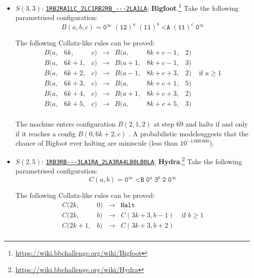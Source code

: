 \documentclass[a4paper,british]{article}
\theoremstyle{definition} %
\numberwithin{equation}{section}
\theoremstyle{definition} %
\newcommand{\tm}[1]{\href{https://bbchallenge.org/#1}{\texttt{\nolinkurl{#1}}}}
\newcommand{\szero}{\texttt{0}\xspace}
\newcommand{\sone}{\texttt{1}\xspace}
\begin{document}
\begin{itemize}
    \item $S(3,3)$: \tm{1RB2RA1LC_2LC1RB2RB_---2LA1LA}; \textbf{Bigfoot}.\footnote{\label{note:bigfoot}\url{https://wiki.bbchallenge.org/wiki/Bigfoot}} Take the following parametrised configuration:
          $$B(a,b,c) = \szero^\infty\; (\sone \texttt{2})^a \; (\sone \sone)^b \; \texttt{<A} \; (\sone \sone)^c \; \szero^\infty$$

          The following Collatz-like rules can be proved:
          \[
              \begin{array}{lllcllll}
                  B(a, & 6k,   & c) & \to & B(a,   & 8k + c - 1, & 2)                        \\
                  B(a, & 6k+1, & c) & \to & B(a+1, & 8k + c - 1, & 3)                        \\
                  B(a, & 6k+2, & c) & \to & B(a-1, & 8k + c + 3, & 2) & \text{ if } a \geq 1 \\
                  B(a, & 6k+3, & c) & \to & B(a,   & 8k + c + 1, & 5)                        \\
                  B(a, & 6k+4, & c) & \to & B(a+1, & 8k + c + 3, & 2)                        \\
                  B(a, & 6k+5, & c) & \to & B(a,   & 8k + c + 5, & 3)                        \\
              \end{array}
          \]

          The machine enters configuration $B(2,1,2)$ at step 69 and halts if and only if it reaches a config $B(0,6k+2,c)$ \cite{ligocki2023bb33}. A probabilistic model suggests that the chance of Bigfoot ever halting are miniscule (less than $10^{-1\,000\,000}$).

    \item $S(2,5)$: \tm{1RB3RB---3LA1RA_2LA3RA4LB0LB0LA}; \textbf{Hydra}.\footnote{\label{note:hydra}\url{https://wiki.bbchallenge.org/wiki/Hydra}} Take the following parametrised configuration:
          $$C(a,b) = \szero^\infty \; \texttt{<B} \; \szero^a \; \texttt{3}^b \; \texttt{2} \; \szero^\infty$$

          The following Collatz-like rules can be proved:
          \[
              \begin{array}{llcll}
                  C(2k,   & 0) & \longrightarrow & \texttt{Halt}                        \\
                  C(2k,   & b) & \longrightarrow & C(3k+3, b-1)  & \text{ if } b \geq 1 \\
                  C(2k+1, & b) & \longrightarrow & C(3k+3, b+2)                         \\
              \end{array}
          \]


\end{itemize}
\end{document}
